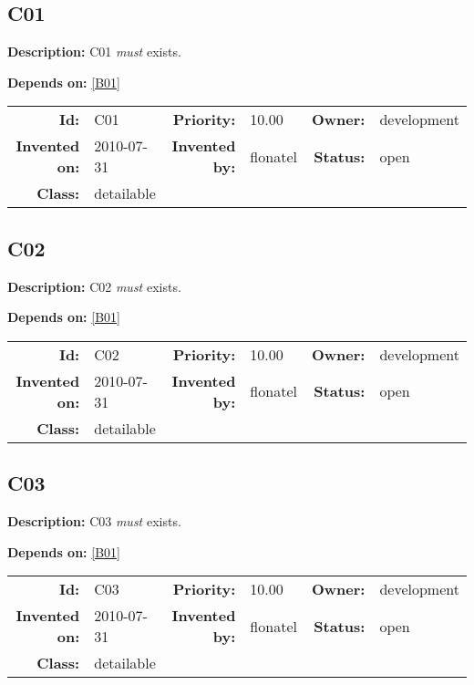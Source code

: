 \subsection{C01}\label{C01}
\textbf{Description:} C01 \textsl{must} exists.

\textbf{Depends on:} \ref{B01} 

\par
{\small \begin{center}\begin{tabular}{rlrlrl}
\textbf{Id:} & C01  & \textbf{Priority:} & 10.00  & \textbf{Owner:} & development\\ 
\textbf{Invented on:} & 2010-07-31  & \textbf{Invented by:} & flonatel  & \textbf{Status:} & open \\ 
\textbf{Class:} & detailable  & & & \end{tabular}\end{center} }
\subsection{C02}\label{C02}
\textbf{Description:} C02 \textsl{must} exists.

\textbf{Depends on:} \ref{B01} 

\par
{\small \begin{center}\begin{tabular}{rlrlrl}
\textbf{Id:} & C02  & \textbf{Priority:} & 10.00  & \textbf{Owner:} & development\\ 
\textbf{Invented on:} & 2010-07-31  & \textbf{Invented by:} & flonatel  & \textbf{Status:} & open \\ 
\textbf{Class:} & detailable  & & & \end{tabular}\end{center} }
\subsection{C03}\label{C03}
\textbf{Description:} C03 \textsl{must} exists.

\textbf{Depends on:} \ref{B01} 

\par
{\small \begin{center}\begin{tabular}{rlrlrl}
\textbf{Id:} & C03  & \textbf{Priority:} & 10.00  & \textbf{Owner:} & development\\ 
\textbf{Invented on:} & 2010-07-31  & \textbf{Invented by:} & flonatel  & \textbf{Status:} & open \\ 
\textbf{Class:} & detailable  & & & \end{tabular}\end{center} }
